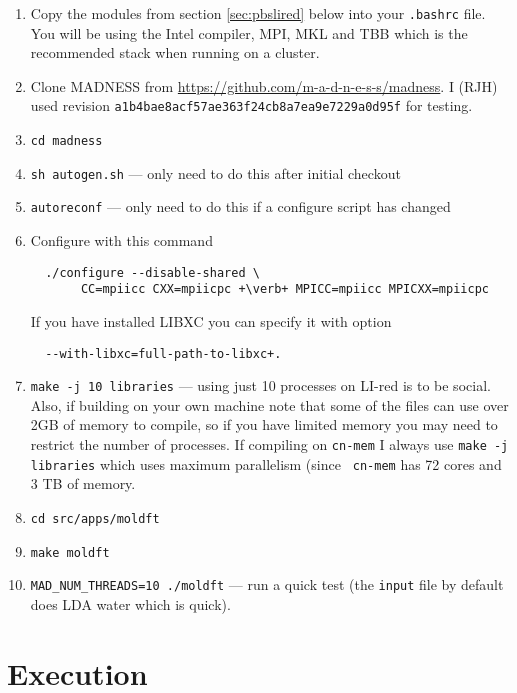 \documentclass[letterpaper]{book}
\begin{document}
\begin{enumerate}
\item Copy the modules from section \ref{sec:pbslired} below into your
  \verb+.bashrc+ file.  You will be using the Intel compiler, MPI, MKL
  and TBB which is the recommended stack when running on a cluster.

\item Clone MADNESS from
  \url{https://github.com/m-a-d-n-e-s-s/madness}.  I (RJH) used
  revision {\tt a1b4bae8acf57ae363f24cb8a7ea9e7229a0d95f} for testing.

\item {\tt cd madness}

\item \verb+sh autogen.sh+ --- only need to do this after initial checkout

\item \verb+autoreconf+ --- only need to do this if a configure script has changed

\item Configure with this command
\begin{verbatim}
  ./configure --disable-shared \
       CC=mpiicc CXX=mpiicpc +\verb+ MPICC=mpiicc MPICXX=mpiicpc
\end{verbatim}
If you have installed LIBXC you can specify it with option
\begin{verbatim}
  --with-libxc=full-path-to-libxc+.
\end{verbatim}

\item \verb+make -j 10 libraries+ --- using just 10 processes on
  LI-red is to be social.  Also, if building on your own machine note
  that some of the files can use over 2GB of memory to compile, so if
  you have limited memory you may need to restrict the number of
  processes.  If compiling on {\tt cn-mem} I always use
  \verb+make -j libraries+ which uses maximum parallelism (since {\tt
    cn-mem} has 72 cores and 3 TB of memory.

\item \verb+cd src/apps/moldft+

\item \verb+make moldft+

\item \verb+MAD_NUM_THREADS=10 ./moldft+ --- run a quick test (the {\tt input} file by default does LDA water which is quick).

\end{enumerate}


\chapter{Execution}
\end{document}
